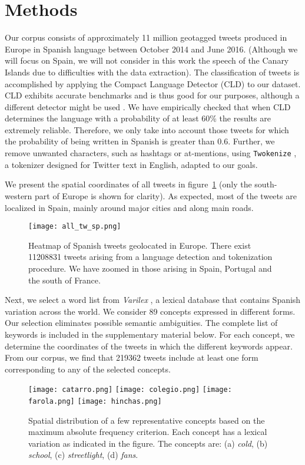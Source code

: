 \documentclass[11pt]{article}
\begin{document}
\section{Methods}
Our corpus consists of approximately 11 million geotagged tweets produced in Europe in Spanish language between October 2014
and June 2016. (Although we will focus on Spain, we will not consider in this work the speech of the Canary Islands due to difficulties with the data extraction). The classification of tweets is accomplished by applying the Compact Language Detector (CLD) \cite{CLD} to our dataset. CLD exhibits accurate benchmarks and is thus good for our purposes, although a different detector might be used \cite{langid}.
We have empirically checked that when CLD determines the language with a probability of at least 60\% the results are extremely reliable. Therefore, we only take into account those tweets for which the probability of being written in Spanish is greater than $0.6$. 
Further, we remove unwanted characters, such as hashtags or at-mentions, using \texttt{Twokenize} \cite{twokenizer},
a tokenizer designed for Twitter text in English, adapted to our goals. 

We present the spatial coordinates of all tweets in figure~\ref{all_tw_es}
(only the south-western part of Europe is shown for clarity).
As expected, most of the tweets are localized in Spain, mainly around major cities and along main roads.

\begin{figure}[t]
\centering
\texttt{[image: all\_tw\_sp.png]}
\caption{Heatmap of Spanish tweets geolocated in Europe. There exist 11208831 tweets arising from a language detection and tokenization procedure. We have zoomed in those arising in Spain, Portugal and the south of France.}
\label{all_tw_es}
\end{figure}

Next, we select a word list from \emph{Varilex} \cite{Varilex}, a lexical database that contains Spanish variation across the world. We consider 89 concepts expressed in different forms. Our selection eliminates possible semantic ambiguities. The complete list of keywords is included in the supplementary material below. For each concept, we determine the coordinates of the tweets in which the different keywords appear. From our corpus, we find that 219362 tweets include at least one form corresponding to any of the selected concepts. 

\begin{figure*}[t]
\centering
{\texttt{[image: catarro.png]}}
{\texttt{[image: colegio.png]}}
{\texttt{[image: farola.png]}}
{\texttt{[image: hinchas.png]}}
\caption{Spatial distribution of a few representative concepts based on the maximum absolute frequency criterion.
Each concept has a lexical variation as indicated in the figure.
The concepts are: (a) \emph{cold}, (b) \emph{school}, (c) \emph{streetlight}, (d) \emph{fans}.}
\label{qualitative}
\end{figure*}
\end{document}
